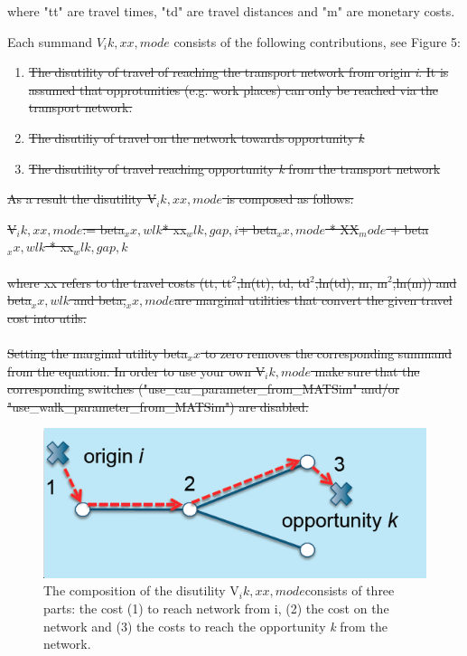 \begin{itemize}
\begin{itemize}

     where "tt" are travel times, "td" are travel distances and "m" are monetary costs.

     Each summand $V_ik,xx,mode$ consists of the following contributions, see Figure 5:
\begin{enumerate}
	\item \sout{The disutility of travel of reaching the transport network from origin \emph{i}. It is assumed that opprotunities (e.g. work places) can only be reached via the transport network.}
	\item \sout{The disutiliy of travel on the network towards opportunity \emph{k}}
	\item \sout{The disutility of travel reaching opportunity \emph{k} from the transport network}
\end{enumerate}
\end{itemize}
\end{itemize}

\sout{As a result the disutility V$_ik,xx,mode$ is composed as follows:}

\sout{V$_ik,xx,mode$:= beta$_xx,wlk$* xx$_wlk,gap,i $+ beta$_xx,mode$ * XX$_mode$ + beta$_xx,wlk$ * xx$_wlk,gap,k$
\\
\\  where xx refers to the travel costs (tt, tt$^2$,ln(tt), td, td$^2$,ln(td), m, m$^2$,ln(m)) and beta$_xx,wlk$ and beta,$_xx,mode $are marginal utilities that convert the given travel cost into utils.
\\
\\  Setting the marginal utility beta$_xx$ to zero removes the corresponding summand from the equation. In order to use your own V$_ik,mode$  make sure that the corresponding switches  ("use\_car\_parameter\_from\_MATSim" and/or  "use\_walk\_parameter\_from\_MATSim") are disabled.}

\begin{figure}[htp]
\includegraphics[width=.5\textwidth]{figures/matsim4urbansim/vik.png}
\caption{The composition of the disutility V$_ik,xx,mode $consists  of three parts: the cost (1) to reach network from i, (2) the cost on  the network and (3) the costs to reach the opportunity \emph{k} from the network.}
\end{figure}

